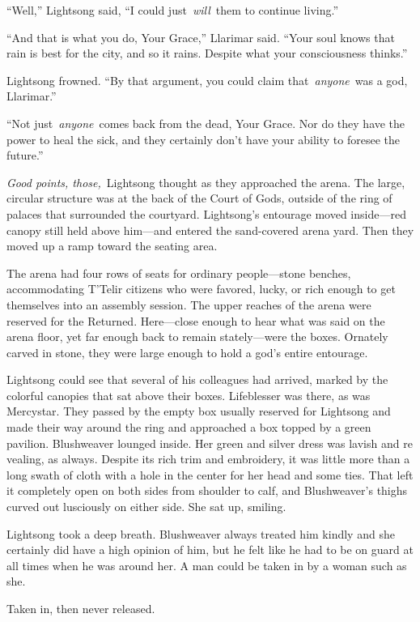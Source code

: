 “Well,” Lightsong said, “I could just~\textit{will}~them to continue living.”

“And that is what you do, Your Grace,” Llarimar said. “Your soul knows that rain is best for the city, and so it rains. Despite what your consciousness thinks.”

Lightsong frowned. “By that argument, you could claim that~\textit{anyone}~was a god, Llarimar.”

“Not just~\textit{anyone}~comes back from the dead, Your Grace. Nor do they have the power to heal the sick, and they certainly don’t have your ability to foresee the future.”

\textit{Good points, those,}~Lightsong thought as they approached the arena. The large, circular structure was at the back of the Court of Gods, outside of the ring of palaces that surrounded the courtyard. Lightsong’s entourage moved inside—red canopy still held above him—and entered the sand-covered arena yard. Then they moved up a ramp toward the seating area.

The arena had four rows of seats for ordinary people—stone benches, accommodating T’Telir citizens who were favored, lucky, or rich enough to get themselves into an assembly session. The upper reaches of the arena were reserved for the Returned. Here—close enough to hear what was said on the arena floor, yet far enough back to remain stately—were the boxes. Ornately carved in stone, they were large enough to hold a god’s entire entourage.

Lightsong could see that several of his colleagues had arrived, marked by the colorful canopies that sat above their boxes. Lifeblesser was there, as was Mercystar. They passed by the empty box usually reserved for Lightsong and made their way around the ring and approached a box topped by a green pavilion. Blushweaver lounged inside. Her green and silver dress was lavish and re vealing, as always. Despite its rich trim and embroidery, it was little more than a long swath of cloth with a hole in the center for her head and some ties. That left it completely open on both sides from shoulder to calf, and Blushweaver’s thighs curved out lusciously on either side. She sat up, smiling.

Lightsong took a deep breath. Blushweaver always treated him kindly and she certainly did have a high opinion of him, but he felt like he had to be on guard at all times when he was around her. A man could be taken in by a woman such as she.

Taken in, then never released.

